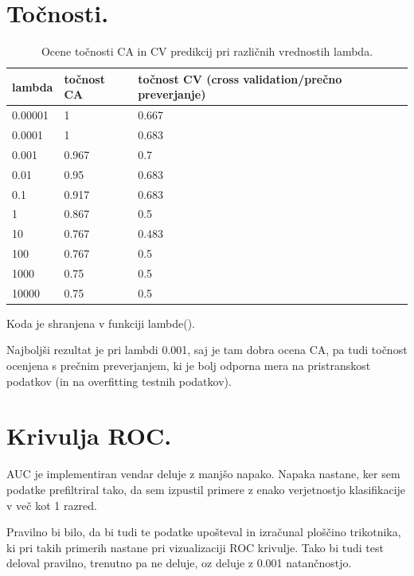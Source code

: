 \documentclass[a4paper,11pt]{article}
\begin{document}
\section{Točnosti.}
\begin{table}[htbp]
\caption{Ocene točnosti CA in CV predikcij pri različnih vrednostih lambda.}
\label{tab1}
\begin{center}
\begin{tabular}{llp{3cm}}
\hline
lambda & točnost CA & točnost CV (cross validation/prečno preverjanje) \\
\hline
0.00001 & 1 & 0.667\\
0.0001 & 1 & 0.683\\
0.001 & 0.967 &  0.7\\
0.01 & 0.95 & 0.683\\
0.1 & 0.917 & 0.683\\
1 & 0.867 & 0.5\\
10 & 0.767 & 0.483\\
100 & 0.767 & 0.5\\
1000 & 0.75 & 0.5\\
10000 & 0.75 & 0.5\\
\hline
\end{tabular}
\end{center}
\end{table}

Koda je shranjena v funkciji lambde().

Najboljši rezultat je pri lambdi 0.001, saj je tam dobra ocena CA, pa tudi točnost ocenjena s prečnim preverjanjem, ki je bolj odporna mera na  pristranskost podatkov (in na overfitting testnih podatkov).

\newpage

\section{Krivulja ROC.}
AUC je implementiran vendar deluje z manjšo napako. Napaka nastane, ker sem podatke prefiltriral tako, da sem izpustil primere z enako verjetnostjo klasifikacije v več kot 1 razred.

Pravilno bi bilo, da bi tudi te podatke upošteval in izračunal ploščino trikotnika, ki pri takih primerih nastane pri vizualizaciji ROC krivulje.
Tako bi tudi test deloval pravilno, trenutno pa ne deluje, oz deluje z 0.001 natančnostjo.
\end{document}
